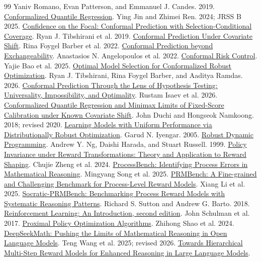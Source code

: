 \begin{thebibliography}{99}
 Yaniv Romano, Evan Patterson, and Emmanuel J. Candes. 2019. \href{https://arxiv.org/abs/1905.03222}{Conformalized Quantile Regression}.
 Ying Jin and Zhimei Ren. 2024; JRSS B 2025. \href{https://arxiv.org/abs/2403.03868}{Confidence on the Focal: Conformal Prediction with Selection-Conditional Coverage}.
 Ryan J. Tibshirani et al. 2019. \href{https://arxiv.org/abs/1904.06019}{Conformal Prediction Under Covariate Shift}.
 Rina Foygel Barber et al. 2022. \href{https://arxiv.org/abs/2202.13415}{Conformal Prediction beyond Exchangeability}.
 Anastasios N. Angelopoulos et al. 2022. \href{https://arxiv.org/abs/2208.02814}{Conformal Risk Control}.
 Yajie Bao et al. 2025. \href{https://arxiv.org/abs/2507.04716}{Optimal Model Selection for Conformalized Robust Optimization}.
 Ryan J. Tibshirani, Rina Foygel Barber, and Aaditya Ramdas. 2026. \href{https://arxiv.org/abs/2608.27310}{Conformal Prediction Through the Lens of Hypothesis Testing: Universality, Impossibility, and Optimality}.
 Rustam Isaev et al. 2026. \href{https://arxiv.org/abs/2609.24929}{Conformalized Quantile Regression and Minimax Limits of Fixed-Score Calibration under Known Covariate Shift}.
 John Duchi and Hongseok Namkoong. 2018; revised 2020. \href{https://arxiv.org/abs/1810.08750}{Learning Models with Uniform Performance via Distributionally Robust Optimization}.
 Garud N. Iyengar. 2005. \href{https://doi.org/10.1287/moor.1040.0129}{Robust Dynamic Programming}.
 Andrew Y. Ng, Daishi Harada, and Stuart Russell. 1999. \href{https://people.eecs.berkeley.edu/~russell/papers/icml99-shaping.pdf}{Policy Invariance under Reward Transformations: Theory and Application to Reward Shaping}.
 Chujie Zheng et al. 2024. \href{https://arxiv.org/abs/2412.06559}{ProcessBench: Identifying Process Errors in Mathematical Reasoning}.
 Mingyang Song et al. 2025. \href{https://arxiv.org/abs/2501.03124}{PRMBench: A Fine-grained and Challenging Benchmark for Process-Level Reward Models}.
 Xiang Li et al. 2025. \href{https://arxiv.org/abs/2505.23474}{Socratic-PRMBench: Benchmarking Process Reward Models with Systematic Reasoning Patterns}.
 Richard S. Sutton and Andrew G. Barto. 2018. \href{https://www.incompleteideas.net/book/bookdraft2018mar21.pdf}{Reinforcement Learning: An Introduction, second edition}.
 John Schulman et al. 2017. \href{https://arxiv.org/abs/1707.06347}{Proximal Policy Optimization Algorithms}.
 Zhihong Shao et al. 2024. \href{https://arxiv.org/abs/2402.03300}{DeepSeekMath: Pushing the Limits of Mathematical Reasoning in Open Language Models}.
 Teng Wang et al. 2025; revised 2026. \href{https://arxiv.org/abs/2503.13551}{Towards Hierarchical Multi-Step Reward Models for Enhanced Reasoning in Large Language Models}.
\end{thebibliography}
